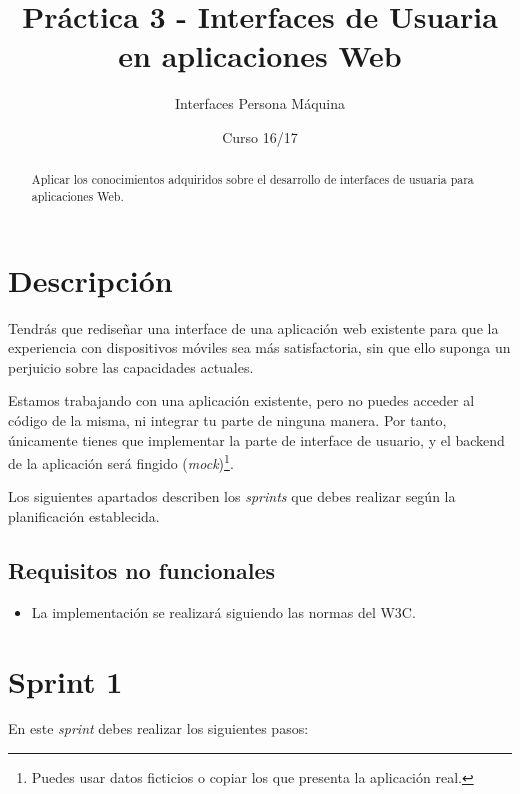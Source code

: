 \documentclass[11pt,a4paper]{article}
\title{Práctica 3 - Interfaces de Usuaria en aplicaciones Web}
\author{Interfaces Persona Máquina}
\date{Curso 16/17}
\begin{document}
\maketitle

\begin{abstract}
  Aplicar los conocimientos adquiridos sobre el desarrollo de
  interfaces de usuaria para aplicaciones Web.
\end{abstract}


\section{Descripción}

Tendrás que rediseñar una interface de una aplicación web existente
para que la experiencia con dispositivos móviles sea más
satisfactoria, sin que ello suponga un perjuicio sobre las capacidades
actuales.

Estamos trabajando con una aplicación existente, pero no puedes
acceder al código de la misma, ni integrar tu parte de ninguna
manera. Por tanto, únicamente tienes que implementar la parte de
interface de usuario, y el backend de la aplicación será fingido
(\emph{mock})\footnote{Puedes usar datos ficticios o copiar los que
  presenta la aplicación real.}.

Los siguientes apartados describen los \emph{sprints} que debes
realizar según la planificación establecida.


\subsection{Requisitos no funcionales}
\begin{itemize}
\item La implementación se realizará siguiendo las normas del W3C.
\end{itemize}


\section{Sprint 1}

En este \emph{sprint} debes realizar los siguientes pasos:
\end{document}
